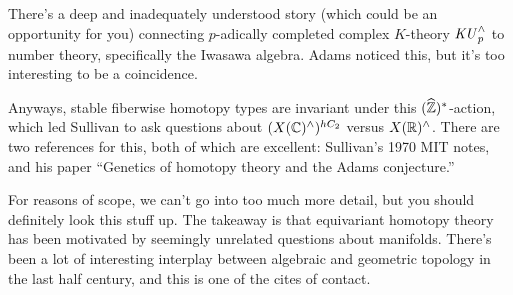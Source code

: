 There's a deep and inadequately understood story (which could be an opportunity for you) connecting $p$-adically
completed complex $K$-theory $\mathit{KU}_p^\land$ to number theory, specifically the Iwasawa algebra. Adams noticed this,
but it's too interesting to be a coincidence.

Anyways, stable fiberwise homotopy types are invariant under this $(\widehat{\mathbb Z})^*$-action, which led Sullivan to
ask questions about $(X(\mathbb C)^\wedge)^{hC_2}$ versus $X(\mathbb R)^\wedge$. There are two references for this, both of which
are excellent: Sullivan's 1970 MIT notes, and his paper ``Genetics of homotopy theory and the Adams conjecture.''

For reasons of scope, we can't go into too much more detail, but you should definitely look this stuff up. The
takeaway is that equivariant homotopy theory has been motivated by seemingly unrelated questions about manifolds.
There's been a lot of interesting interplay between algebraic and geometric topology in the last half century, and
this is one of the cites of contact.
